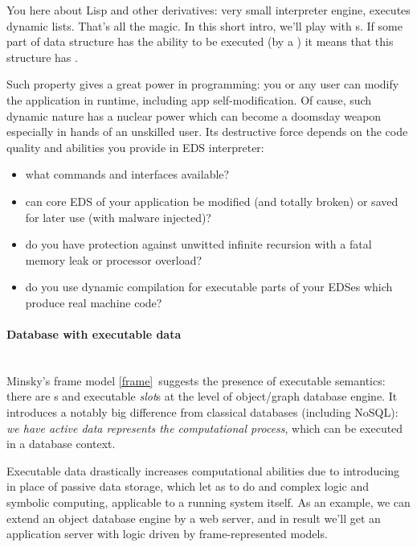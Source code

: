 
You here about Lisp and other derivatives: very small interpreter engine,
executes dynamic lists. That's all the magic. In this short intro, we'll play
with s. If some part of data structure has the
ability to be executed (by a ) it means that this
structure has .

Such property gives a great power in programming: you or any user can modify the
application in runtime, including app self-modification. Of cause, such dynamic
nature has a nuclear power which can become a doomsday weapon especially in
hands of an unskilled user. Its destructive force depends on the code quality
and abilities you provide in EDS interpreter:
\begin{itemize}[nosep]
  \item 
what commands and interfaces available?
  \item 
can core EDS of your application be modified (and totally broken) or saved for later use (with malware injected)?
  \item 
do you have protection against unwitted infinite recursion with a fatal memory leak or processor overload?
  \item 
do you use dynamic compilation for executable parts of your EDSes which produce real machine code?
\end{itemize}

\paragraph{Database with executable data}\ \\

Minsky’s frame model \ref{frame}\ suggests the presence of executable semantics:
there are s and executable \emph{slot}s at the level of
object/graph database engine. It introduces a notably big difference from
classical databases (including NoSQL): \emph{we have active data represents the
computational process}, which can be executed in a database context.

Executable data drastically increases computational abilities due to introducing
 in place of passive data storage, which let as to do
 and complex logic and symbolic computing, applicable to a
running system itself. As an example, we can extend an object database engine by
a web server, and in result we'll get an application server with logic driven by
frame-represented models.
